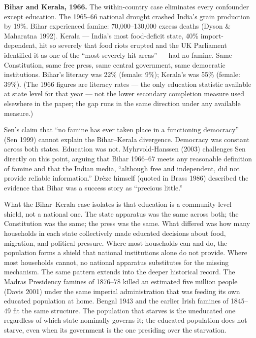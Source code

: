 \documentclass[12pt,letterpaper]{article}
\begin{document}
\textbf{Bihar and Kerala, 1966.} The within-country case eliminates every confounder except education. The 1965--66 national drought crashed India's grain production by 19\%. Bihar experienced famine: 70,000--130,000 excess deaths (Dyson \& Maharatna 1992). Kerala --- India's most food-deficit state, 40\% import-dependent, hit so severely that food riots erupted and the UK Parliament identified it as one of the ``most severely hit areas'' --- had no famine. Same Constitution, same free press, same central government, same democratic institutions. Bihar's literacy was 22\% (female: 9\%); Kerala's was 55\% (female: 39\%). (The 1966 figures are literacy rates --- the only education statistic available at state level for that year --- not the lower secondary completion measure used elsewhere in the paper; the gap runs in the same direction under any available measure.)

Sen's claim that ``no famine has ever taken place in a functioning democracy'' (Sen 1999) cannot explain the Bihar--Kerala divergence. Democracy was constant across both states. Education was not. Myhrvold-Hanssen (2003) challenges Sen directly on this point, arguing that Bihar 1966--67 meets any reasonable definition of famine and that the Indian media, ``although free and independent, did not provide reliable information.'' Drèze himself (quoted in Brass 1986) described the evidence that Bihar was a success story as ``precious little.''

What the Bihar--Kerala case isolates is that education is a
community-level shield, not a national one. The state apparatus was
the same across both; the Constitution was the same; the press was
the same. What differed was how many households in each state
collectively made educated decisions about food, migration, and
political pressure. Where most households can and do, the population
forms a shield that national institutions alone do not provide. Where
most households cannot, no national apparatus substitutes for the
missing mechanism. The same pattern extends into the deeper
historical record. The Madras Presidency famines of 1876--78 killed
an estimated five million people (Davis 2001) under the same imperial
administration that was feeding its own educated population at home.
Bengal 1943 and the earlier Irish famines of 1845--49 fit the same
structure. The population that starves is the uneducated one
regardless of which state nominally governs it; the educated
population does not starve, even when its government is the one
presiding over the starvation.
\end{document}
